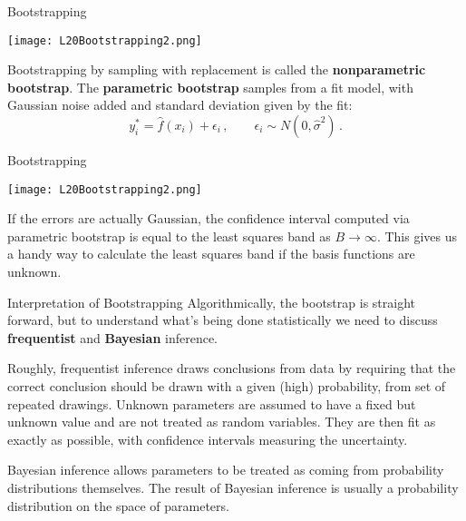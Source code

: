 \documentclass[10pt, table, dvipsnames,xcdraw, handout]{beamer}
\begin{document}
\begin{frame}[fragile]{Bootstrapping}
  \begin{minipage}[t][0.5\textheight][t]{\textwidth}
	\centering \texttt{[image: L20Bootstrapping2.png]} 
  \end{minipage}
  \vfill
\begin{minipage}[t][0.5\textheight][t]{\textwidth}
Bootstrapping by sampling with replacement is called the \textbf{nonparametric bootstrap}. The \textbf{parametric bootstrap} samples from a fit model, with Gaussian noise added and standard deviation given by the fit:
$$
{y}_i^* = \hat{f}(x_i) + \epsilon_i\,,\hspace{2em} \epsilon_i\sim N(0,\hat{\sigma}^2)\,.
$$
\end{minipage}
\end{frame}



\begin{frame}[fragile]{Bootstrapping}
  \begin{minipage}[t][0.5\textheight][t]{\textwidth}
	\centering \texttt{[image: L20Bootstrapping2.png]} 
  \end{minipage}
  \vfill
\begin{minipage}[t][0.5\textheight][t]{\textwidth}
If the errors are actually Gaussian, the confidence interval computed via parametric bootstrap is equal to the least squares band as $B\to\infty$. This gives us a handy way to calculate the least squares band if the basis functions are unknown. 
\end{minipage}
\end{frame}




\begin{frame}[fragile]{Interpretation of Bootstrapping}
Algorithmically, the bootstrap is straight forward, but to understand what's being done statistically we need to discuss \textbf{frequentist} and \textbf{Bayesian} inference. \pause

Roughly, frequentist inference draws conclusions from data by requiring that the correct conclusion should be drawn with a given (high) probability, from set of repeated drawings. Unknown parameters are assumed to have a fixed but unknown value and are not treated as random variables. They are then fit as exactly as possible, with confidence intervals measuring the uncertainty.\pause

Bayesian inference allows parameters to be treated as coming from probability distributions themselves. The result of Bayesian inference is usually a probability distribution on the space of parameters. 
\end{frame}
\end{document}
